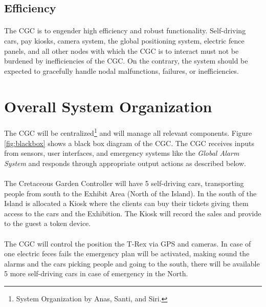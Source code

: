 \documentclass[12pt]{article}
\begin{document}
	\subsection{Efficiency}\label{eff}
	\paragraph{} The CGC is to engender high efficiency and robust functionality. 
	Self-driving cars, pay kiosks, camera system, the global positioning system, 
	electric fence panels, and all other nodes with which the CGC is to interact 
	must not be burdened by inefficiencies of the CGC. On the contrary, the system
	should be expected to gracefully handle nodal malfunctions, failures, or
	inefficiencies.




\section{Overall System Organization} 
\label{sys}
\paragraph{} The CGC will be centralized\footnote{System Organization 
by Anas, Santi, and Siri.} and will manage all relevant components. Figure 
\ref{fig:blackbox} shows a black box diagram of the CGC. The CGC receives inputs 
from sensors, user interfaces, and emergency systems like the \textit{Global 
Alarm System} and responds through appropriate output actions as described 
below.

\paragraph{} The Cretaceous Garden Controller will have 5 self-driving cars, 
transporting people from south to the Exhibit Area (North of the Island). In 
the south of the Island is allocated a Kiosk where the clients can buy their tickets 
giving them access  to the cars and the Exhibition. The Kiosk will record the sales 
and provide to the guest a token device.

\paragraph{} The CGC will control the position the T-Rex via GPS and
cameras. In case of one electric feces fails the emergency plan will be activated,
making sound the alarms and the cars picking people and going to the south,
there will be available 5 more self-driving cars in case of emergency in the 
North.
\end{document}
